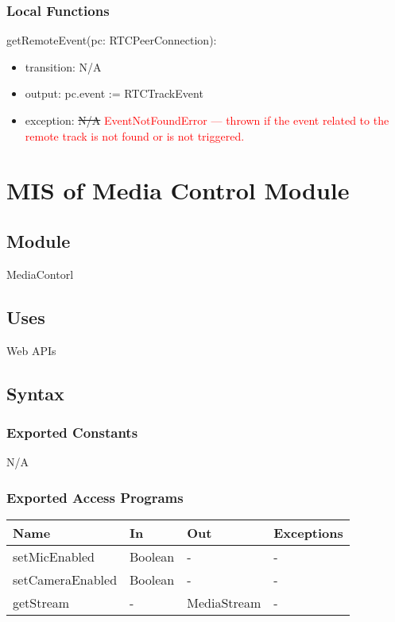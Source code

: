 \documentclass[12pt, titlepage]{article}
\newcommand{\rt}[1]{\textcolor{red}{#1}}
\begin{document}
\subsubsection{Local Functions}

\noindent getRemoteEvent(pc: RTCPeerConnection):
\begin{itemize}
\item transition: N/A
\item output: pc.event := RTCTrackEvent
\item exception: \sout{N/A} \rt{EventNotFoundError --- thrown if the event related to the remote track is not found or is not triggered.}
\end{itemize}

\section{MIS of Media Control Module} \label{sec:mediactrl}

\subsection{Module}

MediaContorl

\subsection{Uses}

\noindent Web APIs

\subsection{Syntax}

\subsubsection{Exported Constants}

N/A

\subsubsection{Exported Access Programs}

\begin{center}
  \begin{tabular}{p{4cm} p{4cm} p{4cm} p{2cm}}
    \hline
    \textbf{Name}          & \textbf{In}   & \textbf{Out}      & \textbf{Exceptions} \\
    \hline
    setMicEnabled    & Boolean & -           & -             \\
    setCameraEnabled & Boolean & -           & -             \\
    getStream        & -       & MediaStream & -             \\
    \hline
  \end{tabular}
\end{center}
\end{document}
